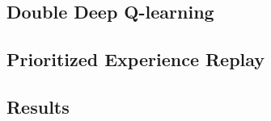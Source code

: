 \subsection{Double Deep Q-learning}\label{sec:agent-dqn-ddqn}


\subsection{Prioritized Experience Replay}\label{sec:agent-dqn-per}


\subsection{Results}\label{sec:agent-dqn-results}

